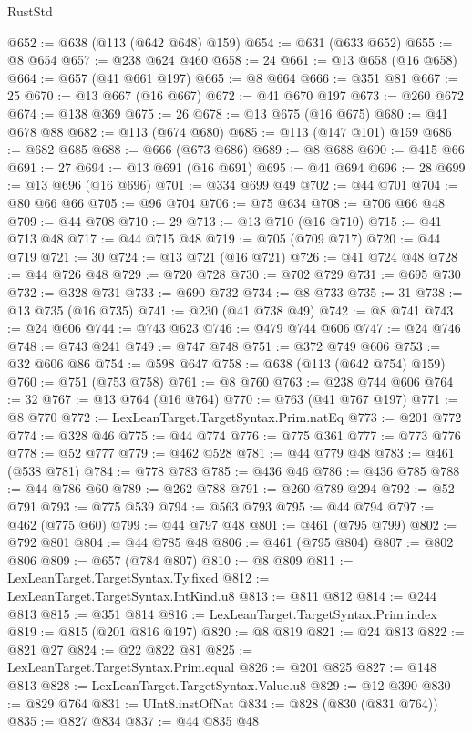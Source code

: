 \begin{lexlean}{RustStd}
\begin{coremodule}
@652 := @638 (@113 (@642 @648) @159)
@654 := @631 (@633 @652)
@655 := @8 @654
@657 := @238 @624 @460
@658 := 24
@661 := @13 @658 (@16 @658)
@664 := @657 (@41 @661 @197)
@665 := @8 @664
@666 := @351 @81
@667 := 25
@670 := @13 @667 (@16 @667)
@672 := @41 @670 @197
@673 := @260 @672
@674 := @138 @369
@675 := 26
@678 := @13 @675 (@16 @675)
@680 := @41 @678 @88
@682 := @113 (@674 @680)
@685 := @113 (@147 @101) @159
@686 := @682 @685
@688 := @666 (@673 @686)
@689 := @8 @688
@690 := @415 @66
@691 := 27
@694 := @13 @691 (@16 @691)
@695 := @41 @694
@696 := 28
@699 := @13 @696 (@16 @696)
@701 := @334 @699 @49
@702 := @44 @701
@704 := @80 @66 @66
@705 := @96 @704
@706 := @75 @634
@708 := @706 @66 @48
@709 := @44 @708
@710 := 29
@713 := @13 @710 (@16 @710)
@715 := @41 @713 @48
@717 := @44 @715 @48
@719 := @705 (@709 @717)
@720 := @44 @719
@721 := 30
@724 := @13 @721 (@16 @721)
@726 := @41 @724 @48
@728 := @44 @726 @48
@729 := @720 @728
@730 := @702 @729
@731 := @695 @730
@732 := @328 @731
@733 := @690 @732
@734 := @8 @733
@735 := 31
@738 := @13 @735 (@16 @735)
@741 := @230 (@41 @738 @49)
@742 := @8 @741
@743 := @24 @606
@744 := @743 @623
@746 := @479 @744 @606
@747 := @24 @746
@748 := @743 @241
@749 := @747 @748
@751 := @372 @749 @606
@753 := @32 @606 @86
@754 := @598 @647
@758 := @638 (@113 (@642 @754) @159)
@760 := @751 (@753 @758)
@761 := @8 @760
@763 := @238 @744 @606
@764 := 32
@767 := @13 @764 (@16 @764)
@770 := @763 (@41 @767 @197)
@771 := @8 @770
@772 := LexLeanTarget.TargetSyntax.Prim.natEq
@773 := @201 @772
@774 := @328 @46
@775 := @44 @774
@776 := @775 @361
@777 := @773 @776
@778 := @52 @777
@779 := @462 @528
@781 := @44 @779 @48
@783 := @461 (@538 @781)
@784 := @778 @783
@785 := @436 @46
@786 := @436 @785
@788 := @44 @786 @60
@789 := @262 @788
@791 := @260 @789 @294
@792 := @52 @791
@793 := @775 @539
@794 := @563 @793
@795 := @44 @794
@797 := @462 (@775 @60)
@799 := @44 @797 @48
@801 := @461 (@795 @799)
@802 := @792 @801
@804 := @44 @785 @48
@806 := @461 (@795 @804)
@807 := @802 @806
@809 := @657 (@784 @807)
@810 := @8 @809
@811 := LexLeanTarget.TargetSyntax.Ty.fixed
@812 := LexLeanTarget.TargetSyntax.IntKind.u8
@813 := @811 @812
@814 := @244 @813
@815 := @351 @814
@816 := LexLeanTarget.TargetSyntax.Prim.index
@819 := @815 (@201 @816 @197)
@820 := @8 @819
@821 := @24 @813
@822 := @821 @27
@824 := @22 @822 @81
@825 := LexLeanTarget.TargetSyntax.Prim.equal
@826 := @201 @825
@827 := @148 @813
@828 := LexLeanTarget.TargetSyntax.Value.u8
@829 := @12 @390
@830 := @829 @764
@831 := UInt8.instOfNat
@834 := @828 (@830 (@831 @764))
@835 := @827 @834
@837 := @44 @835 @48

\end{coremodule}
\end{lexlean}
